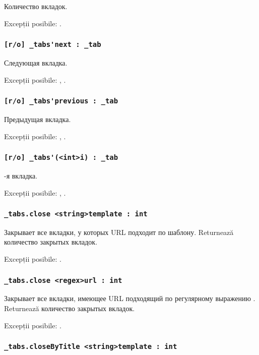 Количество вкладок.

Excepții posibile: .

\subsubsection{\lstinline|[r/o] _tabs'next : _tab|}

Следующая вкладка.

Excepții posibile: , .

\subsubsection{\lstinline|[r/o] _tabs'previous : _tab|}

Предыдущая вкладка.

Excepții posibile: , .

\subsubsection{\lstinline|[r/o] _tabs'(<int>i) : _tab|}

-я вкладка.

Excepții posibile: , .

\subsubsection{\lstinline|_tabs.close <string>template : int|}

Закрывает все вкладки, у которых URL подходит по шаблону. Returnează количество закрытых вкладок.

Excepții posibile: .

\subsubsection{\lstinline|_tabs.close <regex>url : int|}

Закрывает все вкладки, имеющее URL подходящий по регулярному выражению . Returnează количество закрытых вкладок.

Excepții posibile: .

\subsubsection{\lstinline|_tabs.closeByTitle <string>template : int|}

